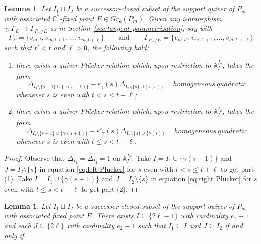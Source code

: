 \documentclass{amsart}
\newtheorem{lemma}[theorem]{Lemma}
\numberwithin{equation}{section}
\renewcommand{\AA}{\mathbb{A}}
\newcommand{\CC}{\mathbb{C}}
\newcommand{\bfe}{\mathbf{e}}
\begin{document}
  \begin{lemma}
    Let $I_1\sqcup I_2$ be a successor-closed subset of the support quiver of $\tilde P_m$ with associated $\CC^*$-fixed point $E\in Gr_\bfe(P_m)$.
    Given any isomorphism $\gamma:\Gamma_E\to\Gamma_{P_m/E}$ as in Section~\ref{sec:tangent parametrization}, say with
    \[\Gamma_E=\{v_{m,t},v_{m,t+1},\ldots,v_{m,t+\ell}\}\qquad\text{and}\qquad\Gamma_{P_m/E}=\{v_{m,t'},v_{m,t'+1},\ldots,v_{m,t'+\ell}\}\]
    such that $t'<t$ and $\ell>0$, the following hold:
    \begin{enumerate}
      \item there exists a quiver Pl\"ucker relation which, upon restriction to $\AA_{I_1}^{I_2}$, takes the form
        \[\Delta_{I_1\setminus\{s-1\}\cup\{\gamma(s-1)\}}-\varepsilon_\gamma(s)\Delta_{I_2\setminus\{s\}\cup\{\gamma(s)\}}=homogeneous~quadratic\]
        whenever $s$ is even with $t<s\le t+\ell$;
      \item there exists a quiver Pl\"ucker relation which, upon restriction to $\AA_{I_1}^{I_2}$, takes the form
        \[\Delta_{I_1\setminus\{s+1\}\cup\{\gamma(s+1)\}}-\varepsilon'_\gamma(s)\Delta_{I_2\setminus\{s\}\cup\{\gamma(s)\}}=homogeneous~quadratic\]
        whenever $s$ is even with $t\le s<t+\ell$.
    \end{enumerate}
  \end{lemma}
  \begin{proof}
    Observe that $\Delta_{I_1}=\Delta_{I_2}=1$ on $\AA_{I_1}^{I_2}$.
    Take $I=I_1\cup\{\gamma(s-1)\}$ and $J=I_2\setminus\{s\}$ in equation \eqref{eq:left Plucker} for $s$ even with $t<s\le t+\ell$ to get part (1).
    Take $I=I_1\cup\{\gamma(s+1)\}$ and $J=I_2\setminus\{s\}$ in equation \eqref{eq:right Plucker} for $s$ even with $t\le s<t+\ell$ to get part (2).
  \end{proof}

  \begin{lemma}
    Let $I_1\sqcup I_2$ be a successor-closed subset of the support quiver of $\tilde P_m$ with associated fixed point $E$.
    There exists $I\subseteq\{2\ell-1\}$ with cardinality $e_1+1$ and each $J\subseteq\{2\ell\}$ with cardinality $e_2-1$ such that $I_1\subseteq I$ and $J\subseteq I_2$ if and only if
  \end{lemma}
\end{document}
